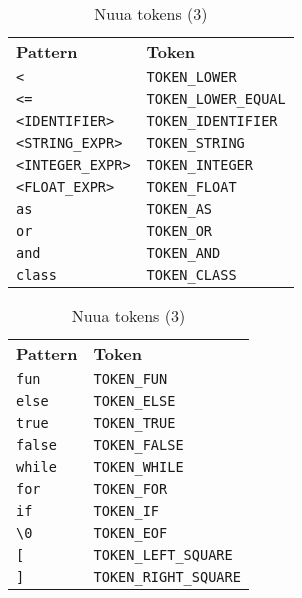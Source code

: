 \begin{table}[H]
	\centering
	\begin{subtable}{0.45\textwidth}
		\centering
        \begin{tabular}{ l l }
            \textbf{Pattern} & \textbf{Token} \\
            \texttt{<} & \texttt{TOKEN\_LOWER} \\
            \texttt{<=} & \texttt{TOKEN\_LOWER\_EQUAL} \\
            \texttt{<IDENTIFIER>} & \texttt{TOKEN\_IDENTIFIER} \\
            \texttt{<STRING\_EXPR>} & \texttt{TOKEN\_STRING} \\
            \texttt{<INTEGER\_EXPR>} & \texttt{TOKEN\_INTEGER} \\
            \texttt{<FLOAT\_EXPR>} & \texttt{TOKEN\_FLOAT} \\
            \texttt{as} & \texttt{TOKEN\_AS} \\
            \texttt{or} & \texttt{TOKEN\_OR} \\
            \texttt{and} & \texttt{TOKEN\_AND} \\
            \texttt{class} & \texttt{TOKEN\_CLASS} \\
		\end{tabular}
		\caption{}
	\end{subtable}
	\begin{subtable}{0.45\textwidth}
		\centering
        \begin{tabular}{ l l }
            \textbf{Pattern} & \textbf{Token} \\
            \texttt{fun} & \texttt{TOKEN\_FUN} \\
            \texttt{else} & \texttt{TOKEN\_ELSE} \\
            \texttt{true} & \texttt{TOKEN\_TRUE} \\
            \texttt{false} & \texttt{TOKEN\_FALSE} \\
            \texttt{while} & \texttt{TOKEN\_WHILE} \\
            \texttt{for} & \texttt{TOKEN\_FOR} \\
            \texttt{if} & \texttt{TOKEN\_IF} \\
            \texttt{\textbackslash 0} & \texttt{TOKEN\_EOF} \\
            \texttt{[} & \texttt{TOKEN\_LEFT\_SQUARE} \\
            \texttt{]} & \texttt{TOKEN\_RIGHT\_SQUARE} \\
		\end{tabular}
		\caption{}
	\end{subtable}
	\caption{Nuua tokens (3)}
    \label{fig:nuua_tokens_3}
\end{table}

